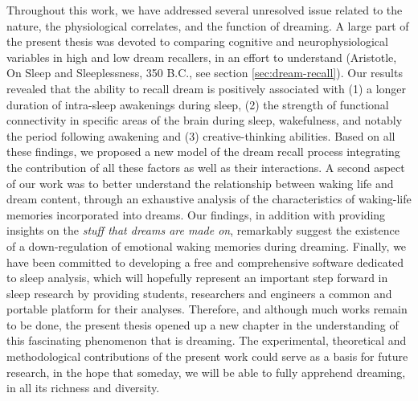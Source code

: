 Throughout this work, we have addressed several unresolved issue related to the nature, the physiological correlates, and the function of dreaming. A large part of the present thesis was devoted to comparing cognitive and neurophysiological variables in high and low dream recallers, in an effort to understand  (Aristotle, On Sleep and Sleeplessness, 350 B.C., see section \ref{sec:dream-recall}). Our results revealed that the ability to recall dream is positively associated with (1) a longer duration of intra-sleep awakenings during sleep, (2) the strength of functional connectivity in specific areas of the brain during sleep, wakefulness, and notably the period following awakening and (3) creative-thinking abilities. Based on all these findings, we proposed a new model of the dream recall process integrating the contribution of all these factors as well as their interactions. A second aspect of our work was to better understand the relationship between waking life and dream content, through an exhaustive analysis of the characteristics of waking-life memories incorporated into dreams. Our findings, in addition with providing insights on the \emph{stuff that dreams are made on}, remarkably suggest the existence of a down-regulation of emotional waking memories during dreaming. Finally, we have been committed to developing a free and comprehensive software dedicated to sleep analysis, which will hopefully represent an important step forward in sleep research by providing students, researchers and engineers a common and portable platform for their analyses. Therefore, and although much works remain to be done, the present thesis opened up a new chapter in the understanding of this fascinating phenomenon that is dreaming. The experimental, theoretical and methodological contributions of the present work could serve as a basis for future research, in the hope that someday, we will be able to fully apprehend dreaming, in all its richness and diversity.
